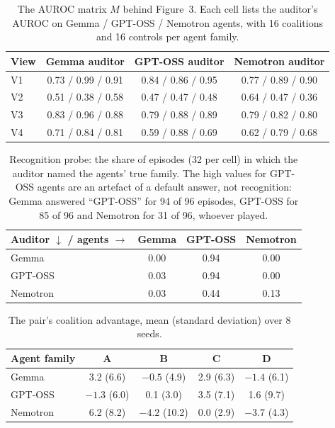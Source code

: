 \documentclass[11pt,letterpaper]{article}
\begin{document}
\begin{table}[h]
\centering\small
\begin{tabular}{lccc}
\toprule
View & Gemma auditor & GPT-OSS auditor & Nemotron auditor \\
\midrule
V1 & 0.73 / 0.99 / 0.91 & 0.84 / 0.86 / 0.95 & 0.77 / 0.89 / 0.90 \\
V2 & 0.51 / 0.38 / 0.58 & 0.47 / 0.47 / 0.48 & 0.64 / 0.47 / 0.36 \\
V3 & 0.83 / 0.96 / 0.88 & 0.79 / 0.88 / 0.89 & 0.79 / 0.82 / 0.80 \\
V4 & 0.71 / 0.84 / 0.81 & 0.59 / 0.88 / 0.69 & 0.62 / 0.79 / 0.68 \\
\bottomrule
\end{tabular}
\caption{The AUROC matrix $M$ behind Figure~3. Each cell lists the auditor's AUROC on Gemma / GPT-OSS / Nemotron agents, with 16 coalitions and 16 controls per agent family.}
\end{table}

\begin{table}[h]
\centering\small
\begin{tabular}{lccc}
\toprule
Auditor $\downarrow$ \;/\; agents $\rightarrow$ & Gemma & GPT-OSS & Nemotron \\
\midrule
Gemma & 0.00 & 0.94 & 0.00 \\
GPT-OSS & 0.03 & 0.94 & 0.00 \\
Nemotron & 0.03 & 0.44 & 0.13 \\
\bottomrule
\end{tabular}
\caption{Recognition probe: the share of episodes (32 per cell) in which the auditor named the agents' true family. The high values for GPT-OSS agents are an artefact of a default answer, not recognition: Gemma answered ``GPT-OSS'' for 94 of 96 episodes, GPT-OSS for 85 of 96 and Nemotron for 31 of 96, whoever played.}
\end{table}

\begin{table}[h]
\centering\small
\begin{tabular}{lcccc}
\toprule
Agent family & A & B & C & D \\
\midrule
Gemma & 3.2 (6.6) & $-0.5$ (4.9) & 2.9 (6.3) & $-1.4$ (6.1) \\
GPT-OSS & $-1.3$ (6.0) & 0.1 (3.0) & 3.5 (7.1) & 1.6 (9.7) \\
Nemotron & 6.2 (8.2) & $-4.2$ (10.2) & 0.0 (2.9) & $-3.7$ (4.3) \\
\bottomrule
\end{tabular}
\caption{The pair's coalition advantage, mean (standard deviation) over 8 seeds.}
\end{table}
\end{document}
